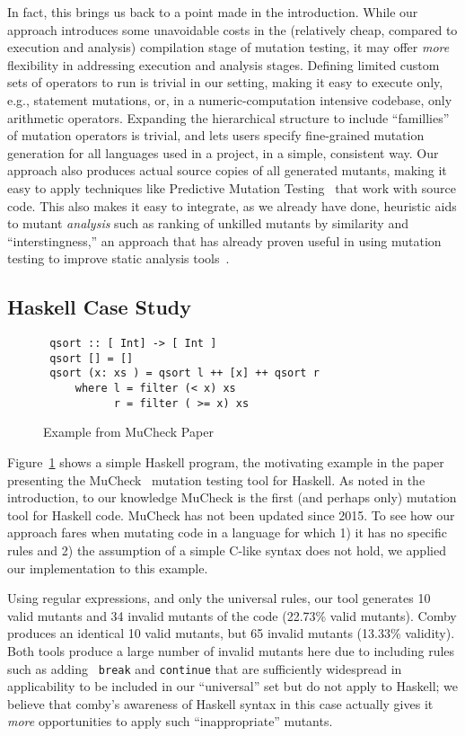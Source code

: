 \documentclass[acmsmall,screen,review,anonymous]{acmart}
\begin{document}
{In fact, this brings us back to a point made in the introduction.
While our approach introduces some unavoidable costs in the
(relatively cheap, compared to execution and analysis) compilation stage of
mutation testing, it may offer \emph{more} flexibility in addressing
execution and analysis stages.  Defining limited custom sets of
operators to run is trivial in our setting, making it easy to
execute only, e.g., statement mutations, or, in a numeric-computation
intensive codebase, only arithmetic operators.  Expanding the
hierarchical structure to include ``famillies'' of mutation operators
is trivial, and lets users specify fine-grained mutation
generation for all languages used in a project, in a simple, consistent way.  Our approach also produces actual source
copies of all generated mutants, making it easy to apply techniques
like Predictive Mutation Testing~\cite{zhangPMT} that work with source
code.  This also makes it easy to integrate, as we already have done, heuristic
aids to mutant \emph{analysis} such as ranking of unkilled mutants by
similarity and ``interstingness,'' an approach that has already proven
useful in using mutation testing to improve static analysis tools~\cite{StatMut}.
\subsection{Haskell Case Study}

\begin{figure}

\begin{lstlisting}
 qsort :: [ Int] -> [ Int ]
 qsort [] = []
 qsort (x: xs ) = qsort l ++ [x] ++ qsort r
     where l = filter (< x) xs
           r = filter ( >= x) xs
\end{lstlisting}
\caption{\small Example from MuCheck Paper~\cite{mucheck}}
\label{fig:haskell}
\end{figure}

Figure~\ref{fig:haskell} shows a simple Haskell program, the
motivating example in the paper presenting the MuCheck~\cite{mucheck}
mutation testing tool for Haskell.  As noted in the introduction, to our
knowledge MuCheck is the first (and perhaps only) mutation tool for
Haskell code.  MuCheck has not been updated since 2015.
To see how our approach fares when mutating code in a language for
which 1) it has no specific rules and 2) the assumption of a simple
C-like syntax does not hold, we applied our implementation to this example.

Using regular expressions, and only the universal rules, our tool
generates 10 valid mutants and 34 invalid mutants of the code (22.73\%
valid mutants).  Comby produces an identical 10 valid mutants, but 65
invalid mutants (13.33\% validity).  Both tools produce a large number
of invalid mutants here due to including rules such as adding {\tt
  break} and {\tt continue} that are sufficiently widespread in
applicability to be included in our ``universal'' set but do not apply
to Haskell; we believe that comby's awareness of Haskell syntax in
this case actually gives it \emph{more} opportunities to apply such
``inappropriate'' mutants.

}
\end{document}

